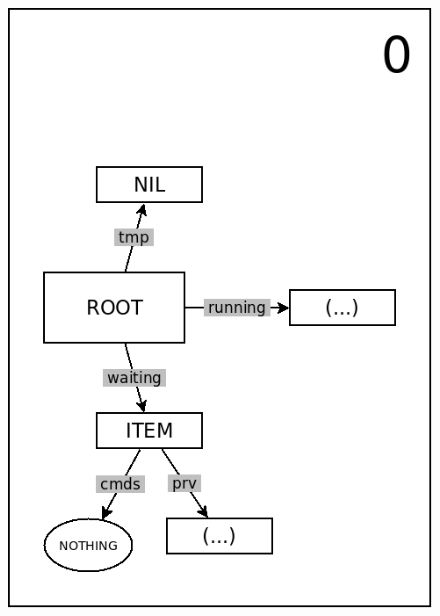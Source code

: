 \documentclass{sig-alternate}
\begin{document}
\begin{figure}%
\begin{minipage}[t]{0.24\linewidth}
\centering
\includegraphics[scale=0.25]{queue-20.png}
\end{minipage}
\begin{minipage}[t]{0.24\linewidth}
\centering

\end{minipage}
\end{figure}
\end{document}
